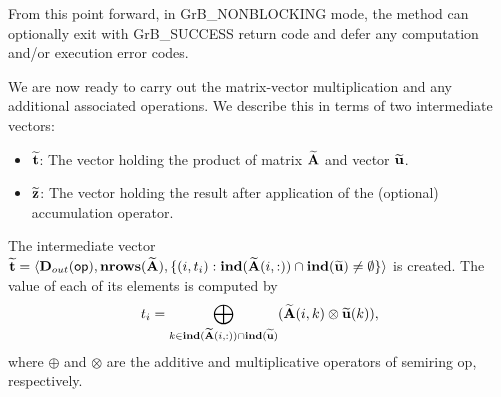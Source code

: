 From this point forward, in {\sf GrB\_NONBLOCKING} mode, the method can 
optionally exit with {\sf GrB\_SUCCESS} return code and defer any computation 
and/or execution error codes.

We are now ready to carry out the matrix-vector multiplication and any additional 
associated operations.  We describe this in terms of two intermediate vectors:
\begin{itemize}
    \item ${\bf \widetilde{t}}$: The vector holding the product of matrix 
    ${\bf \widetilde{A}}$ and vector ${\bf \widetilde{u}}$.
    \item ${\bf \widetilde{z}}$: The vector holding the result after 
    application of the (optional) accumulation operator.
\end{itemize}

The intermediate vector ${\bf \widetilde{t}} = \langle
\mbox{$\mathbf{D}_{out}$}({\sf op}), \bold{nrows}({\bf \widetilde{A}}),
\{(i,t_i) : \bold{ind}({\bf \widetilde{A}}(i,:)) \cap 
\bold{ind}({\bf \widetilde{u}}) \neq \emptyset \} \rangle$
is created.  The value of each of its elements is computed by 
\[t_i = \bigoplus_{k \in \bold{ind}({\bf \widetilde{A}}(i,:)) \cap
\bold{ind}({\bf \widetilde{u}})} ({\bf \widetilde{A}}(i,k)
\otimes {\bf \widetilde{u}}(k)),\] where $\oplus$ and $\otimes$
are the additive and multiplicative operators of semiring {\sf op},
respectively.





